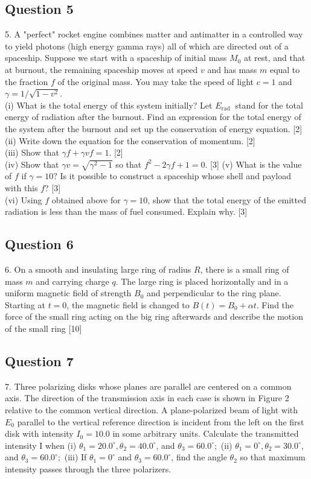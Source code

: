 \documentclass{article}
\begin{document}
\subsection{Question 5}
5. A "perfect" rocket engine combines matter and antimatter in a controlled way to yield photons (high energy gamma rays) all of which are directed out of a spaceship. Suppose we start with a spaceship of initial mass $M_{0}$ at rest, and that at burnout, the remaining spaceship moves at speed $v$ and has mass $m$ equal to the fraction $f$ of the original mass. You may take the speed of light $c=1$ and $\gamma=1 / \sqrt{1-v^{2}}$. \\
(i) What is the total energy of this system initially? Let $E_{\text {rad }}$ stand for the total energy of radiation after the burnout. Find an expression for the total energy of the system after the burnout and set up the conservation of energy equation. [2] \\
(ii) Write down the equation for the conservation of momentum. [2]\\
(iii) Show that $\gamma f+\gamma v f=1$. [2] \\
(iv) Show that $\gamma v=\sqrt{\gamma^{2}-1}$ so that $f^{2}-2 \gamma f+1=0$. [3]
(v) What is the value of $f$ if $\gamma=10 ?$ Is it possible to construct a spaceship whose shell and payload with this $f$? [3] \\
(vi) Using $f$ obtained above for $\gamma=10$, show that the total energy of the emitted radiation is less than the mass of fuel consumed. Explain why. [3]


\subsection{Question 6}
6. On a smooth and insulating large ring of radius $R$, there is a small ring of mass $m$ and carrying charge $q$. The large ring is placed horizontally and in a uniform magnetic field of strength $B_{0}$ and perpendicular to the ring plane. Starting at $t=0$, the magnetic field is changed to $B(t)=B_{0}+\alpha t$. Find the force of the small ring acting on the big ring afterwards and describe the motion of the small ring [10]

\subsection{Question 7}
7. Three polarizing disks whose planes are parallel are centered on a common axis. The direction of the transmission axis in each case is shown in Figure 2 relative to the common vertical direction. A plane-polarized beam of light with $E_{0}$ parallel to the vertical reference direction is incident from the left on the first disk with intensity $I_{0}=10.0$ in some arbitrary units. Calculate the transmitted intensity I when
(i) $\theta_{1}=20.0^{\circ}, \theta_{2}=40.0^{\circ}$, and $\theta_{3}=60.0^{\circ} ;$
(ii) $\theta_{1}=0^{\circ}, \theta_{2}=30.0^{\circ}$, and $\theta_{3}=60.0^{\circ} ;$
(iii) If $\theta_{1}=0^{\circ}$ and $\theta_{3}=60.0^{\circ}$, find the angle $\theta_{2}$ so that maximum intensity passes through the three polarizers.
\end{document}
